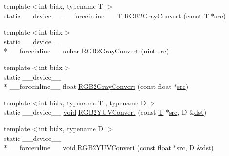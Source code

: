 \begin{DoxyCompactItemize}
\item 
{\footnotesize template$<$int bidx, typename T $>$ }\\static \-\_\-\-\_\-device\-\_\-\-\_\- \-\_\-\-\_\-forceinline\-\_\-\-\_\- \hyperlink{calib3d_8hpp_a3efb9551a871ddd0463079a808916717}{T} \hyperlink{namespacecv_1_1gpu_1_1device_1_1color__detail_a27d42266146ecf1e6bb3b35fe5f99352}{R\-G\-B2\-Gray\-Convert} (const \hyperlink{calib3d_8hpp_a3efb9551a871ddd0463079a808916717}{T} $\ast$\hyperlink{legacy_8hpp_a371cd109b74033bc4366f584edd3dacc}{src})
\item 
{\footnotesize template$<$int bidx$>$ }\\static \-\_\-\-\_\-device\-\_\-\-\_\- \\*
\-\_\-\-\_\-forceinline\-\_\-\-\_\- \hyperlink{core_2types__c_8h_a65f85814a8290f9797005d3b28e7e5fc}{uchar} \hyperlink{namespacecv_1_1gpu_1_1device_1_1color__detail_a65174906125f539150e14664b803e158}{R\-G\-B2\-Gray\-Convert} (uint \hyperlink{legacy_8hpp_a371cd109b74033bc4366f584edd3dacc}{src})
\item 
{\footnotesize template$<$int bidx$>$ }\\static \-\_\-\-\_\-device\-\_\-\-\_\- \\*
\-\_\-\-\_\-forceinline\-\_\-\-\_\- float \hyperlink{namespacecv_1_1gpu_1_1device_1_1color__detail_af78ab2334a72cd030f3496c944b2b8f7}{R\-G\-B2\-Gray\-Convert} (const float $\ast$\hyperlink{legacy_8hpp_a371cd109b74033bc4366f584edd3dacc}{src})
\item 
{\footnotesize template$<$int bidx, typename T , typename D $>$ }\\static \-\_\-\-\_\-device\-\_\-\-\_\- \hyperlink{legacy_8hpp_a8bb47f092d473522721002c86c13b94e}{void} \hyperlink{namespacecv_1_1gpu_1_1device_1_1color__detail_af433ed4738c243b56146f0495b40596d}{R\-G\-B2\-Y\-U\-V\-Convert} (const \hyperlink{calib3d_8hpp_a3efb9551a871ddd0463079a808916717}{T} $\ast$\hyperlink{legacy_8hpp_a371cd109b74033bc4366f584edd3dacc}{src}, D \&\hyperlink{photo__c_8h_aed13e2a25279b24dc954073233fef7a5}{dst})
\item 
{\footnotesize template$<$int bidx, typename D $>$ }\\static \-\_\-\-\_\-device\-\_\-\-\_\- \\*
\-\_\-\-\_\-forceinline\-\_\-\-\_\- \hyperlink{legacy_8hpp_a8bb47f092d473522721002c86c13b94e}{void} \hyperlink{namespacecv_1_1gpu_1_1device_1_1color__detail_abac6119d46ee40fd3261c64d7870720e}{R\-G\-B2\-Y\-U\-V\-Convert} (const float $\ast$\hyperlink{legacy_8hpp_a371cd109b74033bc4366f584edd3dacc}{src}, D \&\hyperlink{photo__c_8h_aed13e2a25279b24dc954073233fef7a5}{dst})

\end{DoxyCompactItemize}
